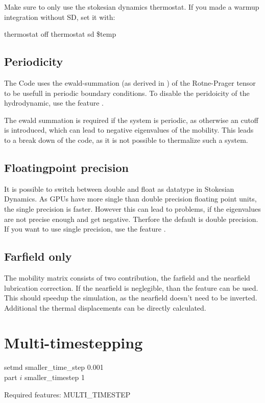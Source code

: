 Make sure to only use the stokesian dynamics thermostat. If you made a warmup
integration without SD, set it with:
\begin{code}
thermostat off
thermostat sd \$temp
\end{code}

\subsection{Periodicity}
The Code uses the ewald-summation (as derived in \cite{beenakker86a}) of the
Rotne-Prager tensor to be usefull in periodic boundary conditions. To disable
the peridoicity of the hydrodynamic, use the feature
. 

The ewald summation is required if the system is periodic, as otherwise an
cutoff is introduced, which can lead to negative eigenvalues of the
mobility. This leads to a break down of the code, as it is not possible to
thermalize such a system.

\subsection{Floatingpoint precision}
It is possible to switch between double and float as datatype in Stokesian
Dynamics. As GPUs have more single than double precision floating point
units, the single precision is faster. However this can lead to problems, if
the eigenvalues are not precise enough and get negative. Therfore the default
is double precision. If you want to use single precision, use the feature
.

\subsection{Farfield only}
The mobility matrix consists of two contribution, the farfield and the
nearfield lubrication correction.
If the nearfield is neglegible, than the feature  can be
used.
This should speedup the simulation, as the nearfield doesn't need to be
inverted. Additional the thermal displacements can be directly calculated.

\section{Multi-timestepping}

\begin{essyntax}
  setmd smaller\_time\_step 0.001 \\
  part $i$ smaller\_timestep 1

  Required features: MULTI\_TIMESTEP
\end{essyntax}

